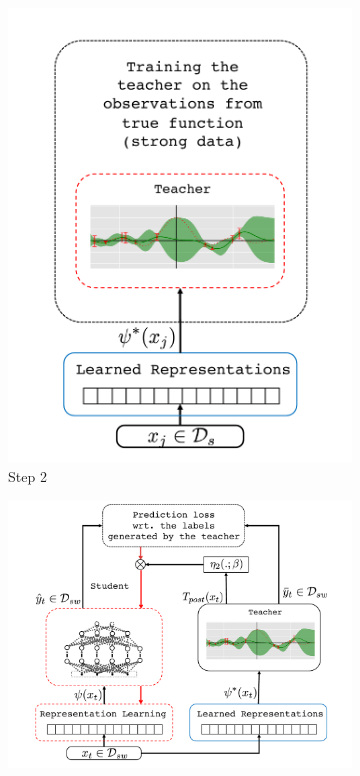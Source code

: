 \begin{figure}[!t]
\begin{subfigure}[t]{0.44\textwidth}
        \includegraphics[width=\textwidth]{03-part-02/chapter-05/figs_and_tables/fig_fwl_step_2.pdf}
        \caption{\label{fig:step2}Step 2}
    \end{subfigure}%
    \vfill
    \vspace{30pt}
    \begin{subfigure}[t]{0.748\textwidth}
        \centering
        \includegraphics[width=\textwidth]{03-part-02/chapter-05/figs_and_tables/fig_fwl_step_3.pdf}

\end{subfigure}
\end{figure}
